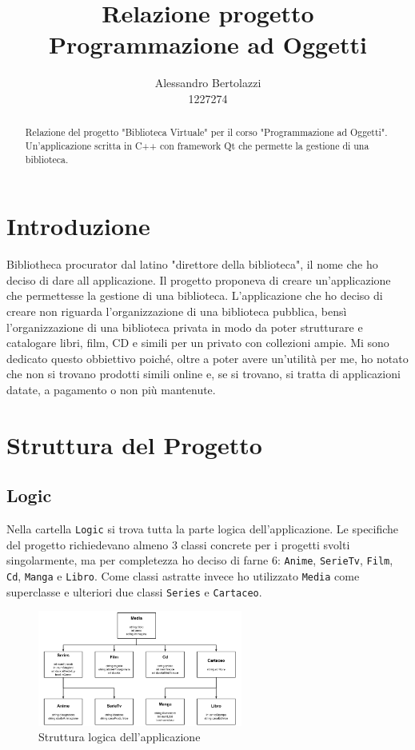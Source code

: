\documentclass[a4paper,12pt]{article}
\title{Relazione progetto Programmazione ad Oggetti}
\author{Alessandro Bertolazzi \\ 1227274}
\date{}
\begin{document}
\fontsize{10pt}{12pt}\selectfont
\maketitle

\begin{abstract}
\noindent Relazione del progetto "Biblioteca Virtuale" per il corso "Programmazione ad Oggetti". Un'applicazione scritta in C++ con framework Qt che permette la gestione di una biblioteca. 
\end{abstract}

\section{Introduzione}
Bibliotheca procurator dal latino "direttore della biblioteca", il nome che ho deciso di dare all applicazione. Il progetto proponeva di creare un'applicazione che permettesse la gestione di una biblioteca. L'applicazione che ho deciso di creare non riguarda l'organizzazione di una biblioteca pubblica, bensì l'organizzazione di una biblioteca privata in modo da poter strutturare e catalogare libri, film, CD e simili per un privato con collezioni ampie. Mi sono dedicato questo obbiettivo poiché, oltre a poter avere un'utilità per me, ho notato che non si trovano prodotti simili online e, se si trovano, si tratta di applicazioni datate, a pagamento o non più mantenute.

\section{Struttura del Progetto}
\subsection{Logic}
Nella cartella \texttt{Logic} si trova tutta la parte logica dell'applicazione. Le specifiche del progetto richiedevano almeno 3 classi concrete per i progetti svolti singolarmente, ma per completezza ho deciso di farne 6: \texttt{Anime}, \texttt{SerieTv}, \texttt{Film}, \texttt{Cd}, \texttt{Manga} e \texttt{Libro}. Come classi astratte invece ho utilizzato \texttt{Media} come superclasse e ulteriori due classi \texttt{Series} e \texttt{Cartaceo}.

\begin{figure}[ht!]
    \centering
    \includegraphics[width=0.6\textwidth]{img/DisegnoSchemaLogico.png}
    \caption{Struttura logica dell'applicazione}
\end{figure}
\end{document}
